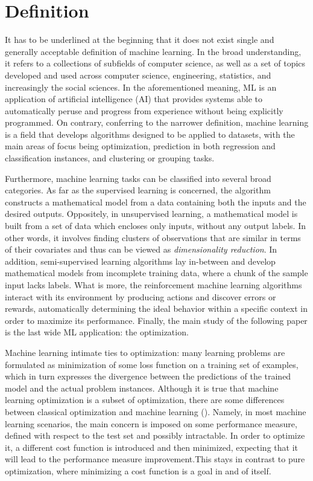 \documentclass{pracamgr}
\numberwithin{equation}{section}
\begin{document}
\section{Definition}

It has to be underlined at the beginning that it does not exist single and generally acceptable definition of machine learning. In the broad understanding, it refers to a collections of subfields of computer science, as well as a set of topics developed and used across computer science, engineering, statistics, and increasingly the social sciences. In the aforementioned meaning, ML is an application of artificial intelligence (AI) that provides systems able to automatically peruse and progress from experience without being explicitly programmed. On contrary, conferring to the narrower definition, machine learning is a field that develops algorithms designed to be applied to datasets, with the main areas of focus being optimization,  prediction in both regression and classification instances, and clustering or grouping tasks.

Furthermore, machine learning tasks can be classified into several broad categories. As far as the supervised learning is concerned, the algorithm constructs a mathematical model from a data containing both the inputs and the desired outputs. Oppositely, in unsupervised learning, a mathematical model is built from a set of data which encloses only inputs, without any output labels. In other words, it involves finding clusters of observations that are similar in terms of their covariates and thus can be viewed as \textit{dimensionality reduction}. In addition, semi-supervised learning algorithms lay in-between and develop mathematical models from incomplete training data, where a chunk of the sample input lacks labels. What is more, the reinforcement machine learning algorithms interact with its environment by producing actions and discover errors or rewards, automatically determining the ideal behavior within a specific context in order to maximize its performance. Finally, the main study of the following paper is the last wide ML application: the optimization.

Machine learning intimate ties to optimization: many learning problems are formulated as minimization of some loss function on a training set of examples, which in turn expresses the divergence between the predictions of the trained model and the actual problem instances. Although it is true that machine learning optimization is a subset of optimization, there are some differences between classical optimization and machine learning (\citet{goodfellow2016deep}). Namely, in most machine learning scenarios, the main concern is imposed on some performance measure, defined with respect to the test set and possibly intractable. In order to optimize it, a different cost function is introduced and then minimized, expecting that it will lead to the performance measure improvement.This stays in contrast to pure optimization, where minimizing a cost function is a goal in and of itself.
\end{document}
